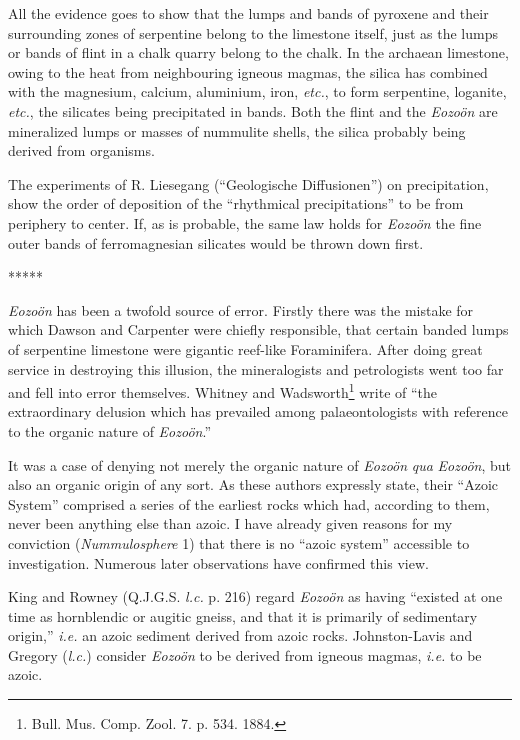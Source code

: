 \documentclass[a4paper, 12pt, oneside]{article}
\begin{document}
All the evidence goes to show that the lumps and bands of pyroxene and their surrounding zones of serpentine belong to the limestone itself, just as the lumps or bands of flint in a chalk quarry belong to the chalk. In the archaean limestone, owing to the heat from neighbouring igneous magmas, the silica has combined with the magnesium, calcium, aluminium, iron, \emph{etc.}, to form serpentine, loganite, \emph{etc.}, the silicates being precipitated in bands. Both the flint and the \emph{Eozoön} are mineralized lumps or masses of nummulite shells, the silica probably being derived from organisms.

The experiments of R. Liesegang (``Geologische Diffusionen'') on precipitation, show the order of deposition of the ``rhythmical precipitations'' to be from periphery to center. If, as is probable, the same law holds for \emph{Eozoön} the fine outer bands of ferromagnesian silicates would be thrown down first. 

\centerline{*\hspace{15mm}*\hspace{15mm}*\hspace{15mm}*\hspace{15mm}*}
\bigskip

\emph{Eozoön} has been a twofold source of error. Firstly there was the mistake for which Dawson and Carpenter were chiefly responsible, that certain banded lumps of serpentine limestone were gigantic reef-like Foraminifera. After doing great service in destroying this illusion, the mineralogists and petrologists went too far and fell into error themselves. Whitney and Wadsworth\footnote{Bull. Mus. Comp. Zool. 7. p. 534. 1884.} write of ``the extraordinary delusion which has prevailed among palaeontologists with reference to the organic nature of \emph{Eozoön}.''

It was a case of denying not merely the organic nature of \emph{Eozoön} \emph{qua} \emph{Eozoön}, but also an organic origin of any sort. As these authors expressly state, their ``Azoic System'' comprised a series of the earliest rocks which had, according to them, never been anything else than azoic. I have already given reasons for my conviction (\emph{Nummulosphere} 1) that there is no ``azoic system'' accessible to investigation. Numerous later observations have confirmed this view.

King and Rowney (Q.J.G.S. \emph{l.c.} p. 216) regard \emph{Eozoön} as having ``existed at one time as hornblendic or augitic gneiss, and that it is primarily of sedimentary origin,'' \emph{i.e.} an azoic sediment derived from azoic rocks. Johnston-Lavis and Gregory (\emph{l.c.}) consider \emph{Eozoön} to be derived from igneous magmas, \emph{i.e.} to be azoic.
\end{document}
